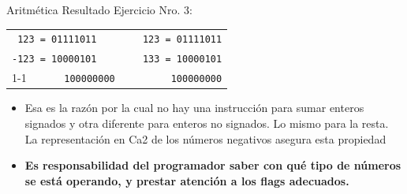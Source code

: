 \documentclass[usenames,table,dvipsnames,aspectratio=169]{beamer}
\begin{document}
\begin{frame}[t,fragile]{Aritmética}
Resultado Ejercicio Nro. 3:
\begin{center}
  \begin{tabular}{lp{1cm}l}
  \verb| 123 = 01111011| & & \verb| 123 = 01111011| \\
  \verb|-123 = 10000101| & & \verb| 133 = 10000101| \\
  \cline{1-1} \cline{3-3}
  \verb|      100000000| & & \verb|      100000000| \\
  \end{tabular}
  \end{center}
\begin{itemize}[<+(1)->] \justifying \parskip 1cm 
  \item Esa es la razón por la cual no hay una instrucción para sumar enteros signados y otra diferente para enteros no signados. Lo mismo para la resta. La representación en Ca2 de los números negativos asegura esta propiedad 
  \item \textbf{Es responsabilidad del programador saber con qué tipo de números se está operando, y prestar atención a los flags adecuados.}
\end{itemize}
\end{frame}
\end{document}
